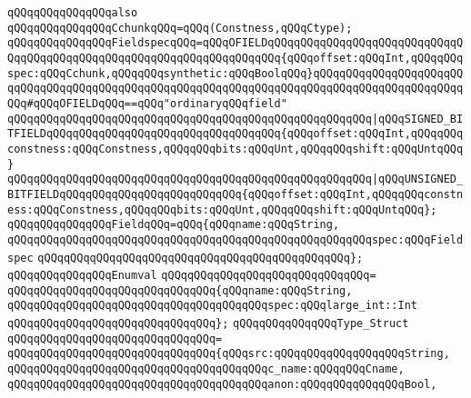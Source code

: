 \newline
\verb|qQQqqQQqqQQqqQQqalso|\newline
\verb|qQQqqQQqqQQqqQQqCchunkqQQq=qQQq(Constness,qQQqCtype);|\newline
\newline
\verb|qQQqqQQqqQQqqQQqFieldspecqQQq=qQQqOFIELDqQQqqQQqqQQqqQQqqQQqqQQqqQQqqQQqqQQqqQQqqQQqqQQqqQQqqQQqqQQqqQQqqQQqqQQq{qQQqoffset:qQQqInt,qQQqqQQqspec:qQQqCchunk,qQQqqQQqsynthetic:qQQqBoolqQQq}qQQqqQQqqQQqqQQqqQQqqQQqqQQqqQQqqQQqqQQqqQQqqQQqqQQqqQQqqQQqqQQqqQQqqQQqqQQqqQQqqQQqqQQqqQQqqQQq#qQQqOFIELDqQQq==qQQq"ordinaryqQQqfield"|\newline
\verb|qQQqqQQqqQQqqQQqqQQqqQQqqQQqqQQqqQQqqQQqqQQqqQQqqQQqqQQq|\verb#|qQQqSIGNED_BITFIELDqQQqqQQqqQQqqQQqqQQqqQQqqQQqqQQqqQQq{qQQqoffset:qQQqInt,qQQqqQQqconstness:qQQqConstness,qQQqqQQqbits:qQQqUnt,qQQqqQQqshift:qQQqUntqQQq}#\newline
\verb|qQQqqQQqqQQqqQQqqQQqqQQqqQQqqQQqqQQqqQQqqQQqqQQqqQQqqQQq|\verb#|qQQqUNSIGNED_BITFIELDqQQqqQQqqQQqqQQqqQQqqQQqqQQq{qQQqoffset:qQQqInt,qQQqqQQqconstness:qQQqConstness,qQQqqQQqbits:qQQqUnt,qQQqqQQqshift:qQQqUntqQQq};#\newline
\newline
\verb|qQQqqQQqqQQqqQQqFieldqQQq=qQQq{qQQqname:qQQqString,|\newline
\verb|qQQqqQQqqQQqqQQqqQQqqQQqqQQqqQQqqQQqqQQqqQQqqQQqqQQqqQQqspec:qQQqFieldspec|\newline
\verb|qQQqqQQqqQQqqQQqqQQqqQQqqQQqqQQqqQQqqQQqqQQqqQQq};|\newline
\newline
\verb|qQQqqQQqqQQqqQQqEnumval|\newline
\verb|qQQqqQQqqQQqqQQqqQQqqQQqqQQqqQQq=|\newline
\verb|qQQqqQQqqQQqqQQqqQQqqQQqqQQqqQQq{qQQqname:qQQqString,|\newline
\verb|qQQqqQQqqQQqqQQqqQQqqQQqqQQqqQQqqQQqqQQqspec:qQQqlarge_int::Int|\newline
\verb|qQQqqQQqqQQqqQQqqQQqqQQqqQQqqQQq};|\newline
\newline
\verb|qQQqqQQqqQQqqQQqType_Struct|\newline
\verb|qQQqqQQqqQQqqQQqqQQqqQQqqQQqqQQq=|\newline
\verb|qQQqqQQqqQQqqQQqqQQqqQQqqQQqqQQq{qQQqsrc:qQQqqQQqqQQqqQQqqQQqString,|\newline
\verb|qQQqqQQqqQQqqQQqqQQqqQQqqQQqqQQqqQQqqQQqc_name:qQQqqQQqCname,|\newline
\verb|qQQqqQQqqQQqqQQqqQQqqQQqqQQqqQQqqQQqqQQqanon:qQQqqQQqqQQqqQQqBool,|\newline
